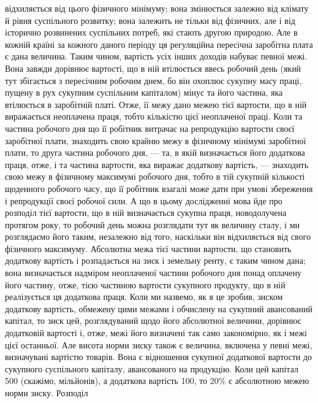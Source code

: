 \parcont{}  %
відхиляється від цього фізичного мінімуму; вона змінюється залежно від клімату
й рівня суспільного розвитку; вона залежить не тільки від фізичних, але
і від історично розвинених суспільних потреб, які стають другою природою.
Але в кожній країні за кожного даного періоду ця регуляційна пересічна заробітна
плата є дана величина. Таким чином, вартість усіх інших доходів набуває
певної межі. Вона завжди дорівнює вартості, що в ній втілюється ввесь
робочий день (який тут збігається з пересічним робочим днем, бо він охоплює
сукупну масу праці, пущену в рух сукупним суспільним капіталом) мінус та
його частина, яка втілюється в заробітній платі. Отже, її межу дано межею
тієї вартости, що в ній виражається неоплачена праця, тобто кількістю цієї
неоплаченої праці. Коли та частина робочого дня що її робітник витрачає на
репродукцію вартости своєї заробітної плати, знаходить свою крайню межу
в фізичному мінімумі заробітної плати, то друга частина робочого дня, — та,
в якій визначається його додаткова праця, отже, і та частина вартости, яка
виражає додаткову вартість, — знаходить свою межу в фізичному максимумі
робочого дня, тобто в тій сукупній кількості щоденного робочого часу, що
її робітник взагалі може дати при умові збереження і репродукції своєї робочої
сили. А що в цьому дослідженні мова йде про розподіл тієї вартости, що
в ній визначається сукупна праця, новодолучена протягом року, то робочий
день можна розглядати тут як величину сталу, і ми розглядаємо його таким,
незалежно від того, наскільки він відхиляється від свого фізичного максимуму.
Абсолютна межа тієї частини вартости, що становить додаткову вартість і
розпадається на зиск і земельну ренту, є таким чином дана; вона визначається
надміром неоплаченої частини робочого дня понад оплачену його
частину, отже, тією частиною вартости сукупного продукту, що в ній реалізується
ця додаткова праця. Коли ми назвемо, як я це зробив, зиском додаткову
вартість, обмежену цими межами і обчислену на сукупний авансований
капітал, то зиск цей, розглядуваний щодо його абсолютної величини, дорівнює
додатковій вартості і, отже, межі його визначені так само закономірно,
як і межі цієї останньої. Але висота норми зиску також є величина,
включена у певні межі, визначувані вартістю товарів. Вона є відношення
сукупної додаткової вартости до сукупного суспільного капіталу, авансованого
на продукцію. Коли цей капітал \deq{} 500 (скажімо, мільйонів), а додаткова
вартість \deq{} 100, то 20\% є абсолютною межею норми зиску. Розподіл
